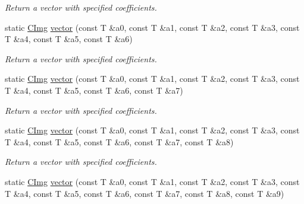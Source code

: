 \begin{DoxyCompactItemize}
\begin{DoxyCompactList}\small\item\em Return a vector with specified coefficients. \end{DoxyCompactList}\item 
\hypertarget{structcimg__library_1_1_c_img_acffe8855e4a74a4576daca09cd066d44}{static \hyperlink{structcimg__library_1_1_c_img}{C\-Img} \hyperlink{structcimg__library_1_1_c_img_acffe8855e4a74a4576daca09cd066d44}{vector} (const T \&a0, const T \&a1, const T \&a2, const T \&a3, const T \&a4, const T \&a5, const T \&a6)}\label{structcimg__library_1_1_c_img_acffe8855e4a74a4576daca09cd066d44}

\begin{DoxyCompactList}\small\item\em Return a vector with specified coefficients. \end{DoxyCompactList}\item 
\hypertarget{structcimg__library_1_1_c_img_adfccff3681166320ad128112989c1d4f}{static \hyperlink{structcimg__library_1_1_c_img}{C\-Img} \hyperlink{structcimg__library_1_1_c_img_adfccff3681166320ad128112989c1d4f}{vector} (const T \&a0, const T \&a1, const T \&a2, const T \&a3, const T \&a4, const T \&a5, const T \&a6, const T \&a7)}\label{structcimg__library_1_1_c_img_adfccff3681166320ad128112989c1d4f}

\begin{DoxyCompactList}\small\item\em Return a vector with specified coefficients. \end{DoxyCompactList}\item 
\hypertarget{structcimg__library_1_1_c_img_abef80223d1718c42bf5db5655a80b4ac}{static \hyperlink{structcimg__library_1_1_c_img}{C\-Img} \hyperlink{structcimg__library_1_1_c_img_abef80223d1718c42bf5db5655a80b4ac}{vector} (const T \&a0, const T \&a1, const T \&a2, const T \&a3, const T \&a4, const T \&a5, const T \&a6, const T \&a7, const T \&a8)}\label{structcimg__library_1_1_c_img_abef80223d1718c42bf5db5655a80b4ac}

\begin{DoxyCompactList}\small\item\em Return a vector with specified coefficients. \end{DoxyCompactList}\item 
\hypertarget{structcimg__library_1_1_c_img_ae57e304038f6d6d2cd229435336e2360}{static \hyperlink{structcimg__library_1_1_c_img}{C\-Img} \hyperlink{structcimg__library_1_1_c_img_ae57e304038f6d6d2cd229435336e2360}{vector} (const T \&a0, const T \&a1, const T \&a2, const T \&a3, const T \&a4, const T \&a5, const T \&a6, const T \&a7, const T \&a8, const T \&a9)}\label{structcimg__library_1_1_c_img_ae57e304038f6d6d2cd229435336e2360}


\end{DoxyCompactItemize}
